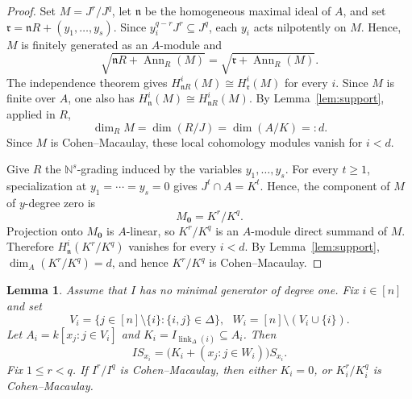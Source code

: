 \documentclass[12pt]{amsart}
\theoremstyle{plain}
\newtheorem{lemma}[theorem]{Lemma}
\theoremstyle{definition}
\theoremstyle{remark}
\begin{document}
\begin{proof}
Set $M=J^r/J^q$, let $\mathfrak n$ be the homogeneous maximal ideal of $A$,
and set $\mathfrak r=\mathfrak nR+(y_1,\ldots,y_s)$. Since
$y_i^{q-r}J^r\subseteq J^q$, each $y_i$ acts nilpotently on $M$. Hence, $M$
is finitely generated as an $A$-module and
$$
\sqrt{\mathfrak nR+\operatorname{Ann}_R(M)}
=
\sqrt{\mathfrak r+\operatorname{Ann}_R(M)}.
$$
The independence theorem gives
$H_{\mathfrak nR}^i(M)\cong H_{\mathfrak r}^i(M)$ for every $i$.
Since $M$ is finite over $A$, one also has
$H_{\mathfrak n}^i(M)\cong H_{\mathfrak nR}^i(M)$. By
Lemma~\ref{lem:support}, applied in $R$,
$$
\dim_RM=\dim(R/J)=\dim(A/K)=:d.
$$
Since $M$ is Cohen--Macaulay, these local cohomology modules vanish for
$i<d$.

Give $R$ the $\mathbb N^s$-grading induced by the variables
$y_1,\ldots,y_s$. For every $t\ge1$, specialization at
$y_1=\cdots=y_s=0$ gives $J^t\cap A=K^t$. Hence, the component of $M$ of
$y$-degree zero is
$$
M_{\mathbf0}=K^r/K^q.
$$
Projection onto $M_{\mathbf0}$ is $A$-linear, so $K^r/K^q$ is an
$A$-module direct summand of $M$. Therefore
$H_{\mathfrak n}^i(K^r/K^q)$ vanishes for every $i<d$. By
Lemma~\ref{lem:support}, $\dim_A(K^r/K^q)=d$, and hence $K^r/K^q$ is
Cohen--Macaulay.
\end{proof}

\begin{lemma}\label{lem:localization}
Assume that $I$ has no minimal generator of degree one. Fix $i\in[n]$ and
set
$$
V_i=\{j\in[n]\setminus\{i\}:\{i,j\}\in\Delta\},
\text{ }
W_i=[n]\setminus(V_i\cup\{i\}).
$$
Let $A_i=k[x_j:j\in V_i]$ and
$K_i=I_{\operatorname{link}_\Delta(i)}\subseteq A_i$. Then
$$
IS_{x_i}=\bigl(K_i+(x_j:j\in W_i)\bigr)S_{x_i}.
$$
Fix $1\le r<q$. If $I^r/I^q$ is Cohen--Macaulay, then either $K_i=0$, or
$K_i^r/K_i^q$ is Cohen--Macaulay.
\end{lemma}
\end{document}
